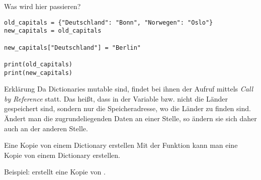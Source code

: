 \begin{fragile}
\begin{block}{Was wird hier passieren?}
\vspace{2pt}
\begin{verbatim}
old_capitals = {"Deutschland": "Bonn", "Norwegen": "Oslo"}
new_capitals = old_capitals

new_capitals["Deutschland"] = "Berlin" 

print(old_capitals)
print(new_capitals)
\end{verbatim}
\end{block}

\pause 
\vspace{12pt}

\begin{block}{Erklärung}
	\vspace{2pt}
Da Dictionaries mutable sind, findet bei ihnen der Aufruf mittels \emph{Call by Reference} statt. Das heißt, dass in der Variable  bzw.  nicht die Länder gespeichert sind, sondern nur die Speicheradresse, wo die Länder zu finden sind. Ändert man die zugrundeliegenden Daten an einer Stelle, so ändern sie sich daher auch an der anderen Stelle. 
\end{block}


\end{fragile}

\begin{frame}
	\begin{block}{Eine Kopie von einem Dictionary erstellen}
		\vspace{2pt}
		Mit der Funktion  kann man eine Kopie von einem Dictionary erstellen. 
		
		Beispiel:  erstellt eine Kopie von .
	\end{block}
\end{frame}

